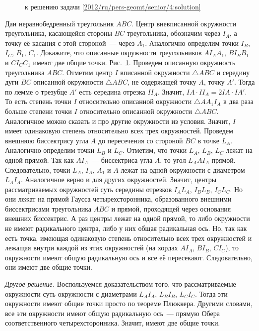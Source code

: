 \ifsolution
\begin{figure}\centering
    \caption{к решению задачи \ref{2012/ru/pers-geomt/senior/4:solution}}
    \label{2012/ru/pers-geomt/senior/4:solution:fig}
\end{figure}%
\fi %

\problem
Дан неравнобедренный треугольник $ABC$.
Центр вневписанной окружности треугольника, касающейся стороны $BC$
треугольника, обозначим через $I_A$, а точку её касания с этой стороной~---
через $A_1$.
Аналогично определим точки $I_B$, $I_C$, $B_1$, $C_1$.
Докажите, что описанные окружности треугольников
$A I_A A_1$, $B I_B B_1$ и $C I_C C_1$ имеют две общие точки.
\solution
\label{2012/ru/pers-geomt/senior/4:solution}%
Рис.~\ref{2012/ru/pers-geomt/senior/4:solution:fig}.
Проведем описанную окружность треугольника $ABC$.
Отметим центр $I$ вписанной окружности $\triangle ABC$ и середину дуги $BC$
описанной окружности $\triangle ABC$, не содержащей точку $A$, точку $A'$.
Тогда по лемме о трезубце $A'$ есть середина отрезка $I I_A$.
Значит, $IA \cdot I I_A = 2 IA \cdot IA'$.
То есть степень точки $I$ относительно описанной окружности
$\triangle A A_1 I_A$ в два раза больше степени точки $I$ относительно описанной
окружности $\triangle ABC$.
Аналогичное можно сказать и про другие окружности из условия.
Значит, $I$ имеет одинаковую степень относительно всех трех окружностей.
Проведем внешнюю биссектрису угла $A$ до пересечения со стороной $BC$ в
точке $L_A$.
Аналогично определим точки $L_B$ и $L_C$.
Отметим, что точки $L_A$, $L_B$, $L_C$ лежат на одной прямой.
Так как $AI_A$~--- биссектриса угла $A$, то угол $L_AAI_A$ прямой.
Следовательно, точки $L_A$, $I_A$, $A_1$ и $A$ лежат на одной окружности с
диаметром $L_AI_A$.
Аналогичное верно и для других окружностей.
Значит, центры рассматриваемых окружностей суть середины отрезков
$I_A L_A$, $I_B L_B$, $I_C L_C$.
Но они лежат на прямой Гаусса четырехсторонника, образованного внешними
биссектрисами треугольника $ABC$ и прямой, проходящей через основания внешних
биссектрис.
А раз центры лежат на одной прямой, то либо окружности не имеют радикального
центра, либо у них общая радикальная ось.
Но, так как есть точка, имеющая одинаковую степень относительно всех трех
окружностей и лежащая внутри каждой из этих окружностей
(на хордах $A I_A$, $B I_B$, $C I_C$),
то окружности имеют общую радикальную ось и все её пересекают.
Следовательно, они имеют две общие точки.
\par
\emph{Другое решение.}
Воспользуемся доказательством того, что рассматриваемые окружности суть
окружности с диаметрами $L_A I_A$, $L_B I_B$, $L_C I_C$.
Тогда эти окружности имеют общие точки просто по теореме Плюккера.
Другими словами, все эти окружности имеют общую радикальную ось~---
прямую Обера соответственного четырехсторонника.
Значит, имеют две общие точки.
\endproblem
